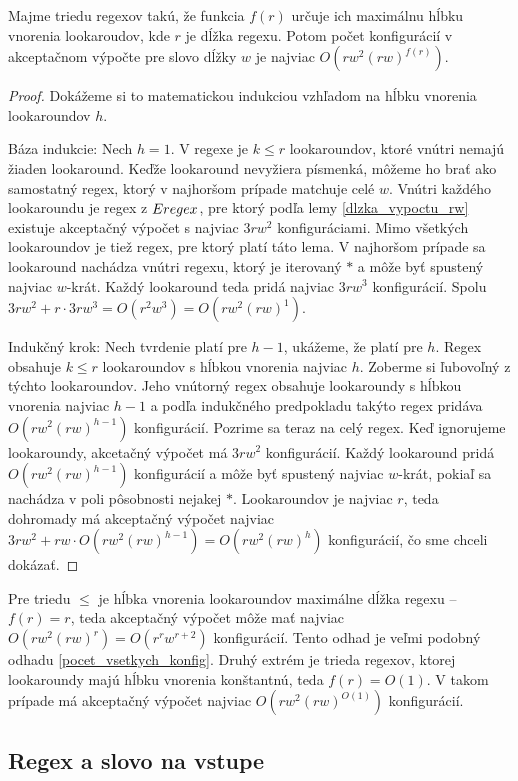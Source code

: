 \begin{lema}
Majme triedu regexov takú, že funkcia $f(r)$ určuje ich maximálnu hĺbku vnorenia lookaroudov, kde $r$ je dĺžka regexu. Potom počet konfigurácií v akceptačnom výpočte pre slovo dĺžky $w$ je najviac $O(rw^2(rw)^{f(r)})$.
\end{lema}
\begin{proof}
Dokážeme si to matematickou indukciou vzhľadom na hĺbku vnorenia lookaroundov $h$.

Báza indukcie: Nech $h=1$. V regexe je $k\leq r$ lookaroundov, ktoré vnútri nemajú žiaden lookaround. Keďže lookaround nevyžiera písmenká, môžeme ho brať ako samostatný regex, ktorý v najhoršom prípade matchuje celé $w$. Vnútri každého lookaroundu je regex z $Eregex$, pre ktorý podľa lemy \ref{dlzka_vypoctu_rw} existuje akceptačný výpočet s najviac $3rw^2$ konfiguráciami. Mimo všetkých lookaroundov je tiež regex, pre ktorý platí táto lema. V najhoršom prípade sa lookaround nachádza vnútri regexu, ktorý je iterovaný $*$ a môže byť spustený najviac $w$-krát. Každý lookaround teda pridá najviac $3rw^3$ konfigurácií. Spolu $3rw^2+r\cdot 3rw^3 = O(r^2w^3) = O(rw^2(rw)^1)$. 

Indukčný krok: Nech tvrdenie platí pre $h-1$, ukážeme, že platí pre $h$. Regex obsahuje $k\leq r$ lookaroundov s hĺbkou vnorenia najviac $h$. Zoberme si ľubovoľný z týchto lookaroundov. Jeho vnútorný regex obsahuje lookaroundy s hĺbkou vnorenia najviac $h-1$ a podľa indukčného predpokladu takýto regex pridáva $O(rw^2(rw)^{h-1})$ konfigurácií. Pozrime sa teraz na celý regex. Keď ignorujeme lookaroundy, akcetačný výpočet má $3rw^2$ konfigurácií. Každý lookaround pridá $O(rw^2(rw)^{h-1})$ konfigurácií a môže byť spustený najviac $w$-krát, pokiaľ sa nachádza v poli pôsobnosti nejakej $*$. Lookaroundov je najviac $r$, teda dohromady má akceptačný výpočet najviac $3rw^2+rw\cdot O(rw^2(rw)^{h-1}) = O(rw^2(rw)^h)$ konfigurácií, čo sme chceli dokázať.
\end{proof}

Pre triedu $\le$ je hĺbka vnorenia lookaroundov maximálne dĺžka regexu -- $f(r)=r$, teda akceptačný výpočet môže mať najviac $O(rw^2(rw)^r) = O(r^rw^{r+2})$ konfigurácií. Tento odhad je veľmi podobný odhadu \ref{pocet_vsetkych_konfig}. Druhý extrém je trieda regexov, ktorej lookaroundy majú hĺbku vnorenia konštantnú, teda $f(r)=O(1)$. V takom prípade má akceptačný výpočet najviac $O(rw^2(rw)^{O(1)})$ konfigurácií.

\subsection{Regex a slovo na vstupe}

